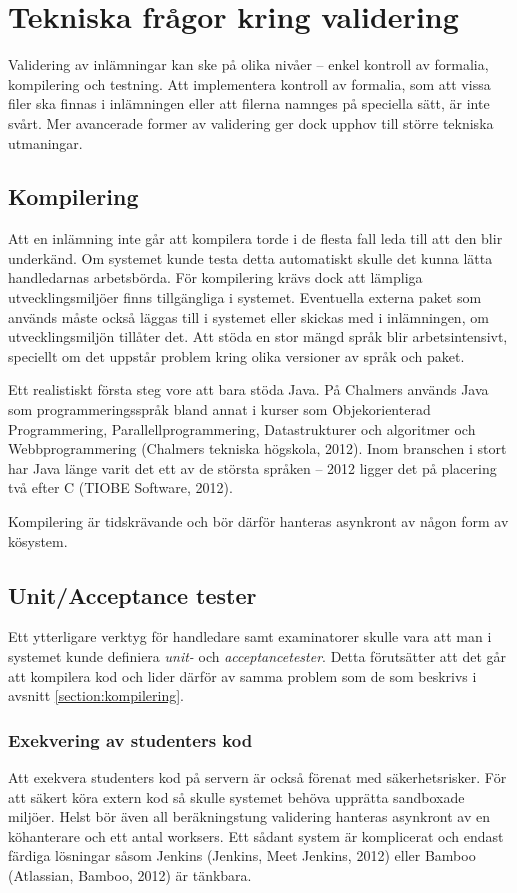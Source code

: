 \section{Tekniska frågor kring validering}

Validering av inlämningar kan ske på olika nivåer – enkel kontroll av formalia, kompilering och testning. 
Att implementera kontroll av formalia, som att vissa filer ska finnas i inlämningen eller att filerna namnges på speciella sätt, är inte svårt. Mer avancerade former av validering ger dock upphov till större tekniska utmaningar.

\subsection{Kompilering}

Att en inlämning inte går att kompilera torde i de flesta fall leda till att den blir underkänd. Om systemet kunde testa detta automatiskt skulle det kunna lätta handledarnas arbetsbörda.
För kompilering krävs dock att lämpliga utvecklingsmiljöer finns tillgängliga i systemet. Eventuella externa paket som används måste också läggas till i systemet eller skickas med i inlämningen, om utvecklingsmiljön tillåter det.
Att stöda en stor mängd språk blir arbetsintensivt, speciellt om det uppstår problem kring olika versioner av språk och paket.

Ett realistiskt första steg vore att bara stöda Java. På Chalmers används Java som programmeringsspråk bland annat i kurser som Objekorienterad Programmering, Parallellprogrammering, Datastrukturer och algoritmer och Webbprogrammering (Chalmers tekniska högskola, 2012). Inom branschen i stort har Java länge varit det ett av de största språken – 2012 ligger det på placering två efter C (TIOBE Software, 2012).

Kompilering är tidskrävande och bör därför hanteras asynkront av någon form av kösystem.

\subsection{Unit/Acceptance tester}
Ett ytterligare verktyg för handledare samt examinatorer skulle vara att man i systemet kunde definiera \emph{unit-} och \emph{ acceptancetester}. Detta förutsätter att det går att kompilera kod och lider därför av samma problem som de som beskrivs i avsnitt \ref{section:kompilering}.
\subsubsection{Exekvering av studenters kod}
Att exekvera studenters kod på servern är också förenat med säkerhetsrisker.
För att säkert köra extern kod så skulle systemet behöva upprätta sandboxade miljöer. Helst bör även all beräkningstung validering hanteras asynkront av en köhanterare och ett antal worksers. Ett sådant system är komplicerat och endast färdiga lösningar såsom Jenkins (Jenkins, Meet Jenkins, 2012) eller Bamboo (Atlassian, Bamboo, 2012) är tänkbara.

